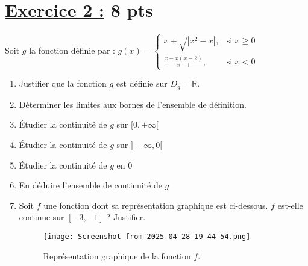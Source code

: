 \documentclass[12pt,a4paper]{article}
\begin{document}
\section*{\underline{Exercice 2 :} 8 pts }
Soit \( g \) la fonction définie par :
\(
g(x) =
\begin{cases}
    x + \sqrt{|x^2 - x|},     & \text{si } x \geq 0 \\
    \frac{x - x(x-2)}{x - 1}, & \text{si } x < 0
\end{cases}
\)

\begin{enumerate}
    \item Justifier que la fonction \( g \) est définie sur \( D_g = \mathbb{R} \).
    \item Déterminer les limites aux bornes de l'ensemble de définition.
    \item Étudier la continuité de \( g \) sur \( [0, +\infty[ \)
    \item Étudier la continuité de \( g \) sur \( ]-\infty, 0[ \)
    \item Étudier la continuité de \( g \) en \( 0 \)
    \item En déduire l'ensemble de continuité de \( g \)
    \item Soit \( f \) une fonction dont sa représentation graphique est ci-dessous. \( f \) est-elle continue sur \( [-3, -1] \) ? Justifier.
          \begin{center}
              \begin{figure}[H]
                  \centering \texttt{[image: Screenshot from 2025-04-28 19-44-54.png]} %
                  \caption{Représentation graphique de la fonction \( f \).}
                  \label{fig:fonction_f}
              \end{figure}
          \end{center}
\end{enumerate}
\end{document}
